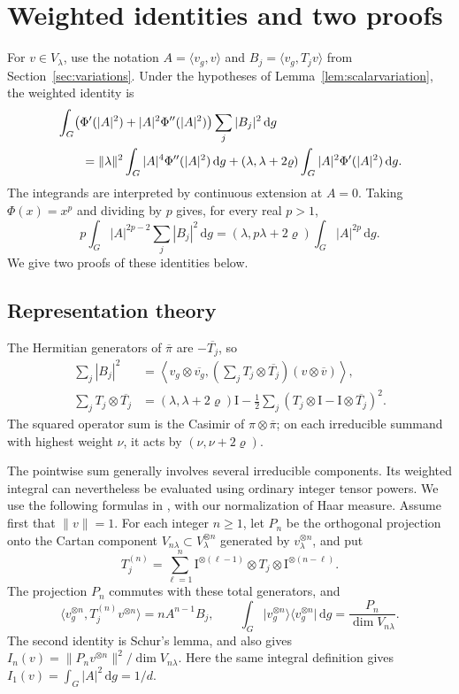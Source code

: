 \documentclass[11pt,reqno]{amsart}
\numberwithin{equation}{section}
\theoremstyle{plain}
\theoremstyle{remark}
\newcommand{\rh}{\varrho}
\newcommand{\dd}{\,\mathrm d}
\newcommand{\Id}{\mathrm I}
\newcommand{\norm}[1]{\lVert#1\rVert}
\newcommand{\ip}[2]{\langle#1,#2\rangle}
\newcommand{\proj}[1]{\lvert#1\rangle\langle#1\rvert}
\begin{document}
\section{Weighted identities and two proofs}\label{app:representation}

For $v\in V_\lambda$, use the notation $A=\ip{v_g}{v}$ and
$B_j=\ip{v_g}{T_jv}$ from Section~\ref{sec:variations}.
Under the hypotheses of Lemma~\ref{lem:scalarvariation}, the weighted identity is
\begin{align}\label{eq:weighted}
 &\int_G\bigl(\Phi'(|A|^2)+|A|^2\Phi''(|A|^2)\bigr)
                    \sum_j|B_j|^2\dd g\notag\\
 &\qquad=\norm{\lambda}^2\int_G|A|^4\Phi''(|A|^2)\dd g
      +(\lambda,\lambda+2\rh)\int_G|A|^2\Phi'(|A|^2)\dd g.
\end{align}
The integrands are interpreted by continuous extension at $A=0$.
Taking $\Phi(x)=x^p$ and dividing by $p$ gives, for every real $p>1$,
\begin{equation}\label{eq:weightedpower}
 p\int_G|A|^{2p-2}\sum_j|B_j|^2\dd g
       =(\lambda,p\lambda+2\rh)\int_G|A|^{2p}\dd g.
\end{equation}
We give two proofs of these identities below.

\subsection{Representation theory}

The Hermitian generators of
$\overline\pi$ are $-\overline{T_j}$, so
\begin{align*}
 \sum_j|B_j|^2
 &=\left\langle v_g\otimes\overline{v_g},
   \left(\sum_jT_j\otimes\overline{T_j}\right)
   (v\otimes\overline v)\right\rangle,\\
 \sum_jT_j\otimes\overline{T_j}
 &=(\lambda,\lambda+2\rh)\Id
   -\frac12\sum_j
      (T_j\otimes\Id-\Id\otimes\overline{T_j})^2.
\end{align*}
The squared operator sum is the Casimir of
$\pi\otimes\overline\pi$; on each irreducible summand with highest
weight $\nu$, it acts by $(\nu,\nu+2\rh)$.

The pointwise sum generally involves several irreducible components.
Its weighted integral can nevertheless be evaluated using ordinary
integer tensor powers. We use the following
formulas  in \cite[Section~III, equations~(14) and~(23)]{Sugita},
with our normalization of Haar measure. Assume first that $\norm v=1$. For each integer
$n\ge1$, let $P_n$ be the orthogonal projection onto the Cartan
component $V_{n\lambda}\subset V_\lambda^{\otimes n}$ generated by
$v_\lambda^{\otimes n}$, and put
\[
 T_j^{(n)}=\sum_{\ell=1}^n
 \Id^{\otimes(\ell-1)}\otimes T_j\otimes\Id^{\otimes(n-\ell)}.
\]
The projection $P_n$ commutes with these total generators, and
\[
 \ip{v_g^{\otimes n}}{T_j^{(n)}v^{\otimes n}}=nA^{n-1}B_j,\qquad
 \int_G\proj{v_g^{\otimes n}}\dd g
   =\frac{P_n}{\dim V_{n\lambda}}.
\]
The second identity is Schur's lemma, and also gives
$I_n(v)=\norm{P_nv^{\otimes n}}^2/\dim V_{n\lambda}$.
Here the same integral definition gives $I_1(v)=\int_G|A|^2\dd g=1/d$.
\end{document}
